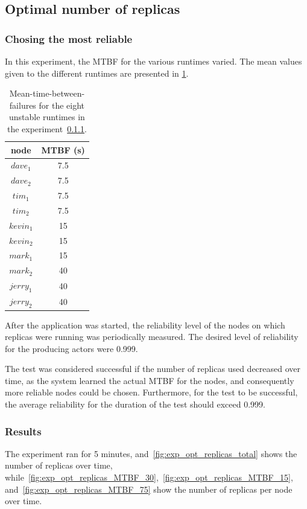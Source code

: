 \documentclass{cslthse-msc}
\begin{document}
\subsection{Optimal number of replicas}
\subsubsection{Chosing the most reliable} \label{sec:eval_opt_nbr_replicas}
In this experiment, the MTBF for the various runtimes varied. The mean values given to the different runtimes are presented in \cref{table:exp_nodes_means}. 

\begin{table}[h]
	\begin{center}
	\begin{tabular}{| c | c |}
	 \hline
	 node & MTBF (s) \\
	 \hline		
	  $dave_1$ & 7.5 \\
	  $dave_2$ & 7.5 \\
	  $tim_1$ & 7.5 \\
	  $tim_2$ & 7.5 \\
	  $kevin_1$ & 15 \\
	  $kevin_2$ & 15 \\
	  $mark_1$ & 15 \\
	  $mark_2$ & 40 \\
	  $jerry_1$ & 40 \\
	  $jerry_2$ & 40 \\
	   \hline
	\end{tabular}
	 \caption{Mean-time-between-failures for the eight unstable runtimes in the experiment~\ref{sec:eval_opt_nbr_replicas}.}
	 \label{table:exp_nodes_means}
	 \end{center}
 \end{table}


After the application was started, the reliability level of the nodes on which replicas were running was periodically measured. The desired level of reliability for the producing actors were 0.999.

The test was considered successful if the number of replicas used decreased over time, as the system learned the actual MTBF for the nodes, and consequently more reliable nodes could be chosen. Furthermore, for the test to be successful, the average reliability for the duration of the test should exceed 0.999. %

\subsubsection*{Results}
The experiment ran for 5 minutes, and~\cref{fig:exp_opt_replicas_total} shows the number of replicas over time, while~\cref{fig:exp_opt_replicas_MTBF_30},~\cref{fig:exp_opt_replicas_MTBF_15}, and~\cref{fig:exp_opt_replicas_MTBF_75} show the number of replicas per node over time.
\end{document}

